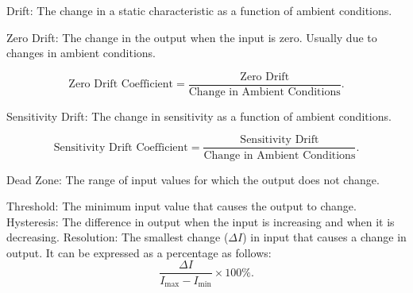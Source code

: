 \documentclass{report}
\begin{document}
\begin{itemize}
	\ii Drift: The change in a static characteristic as a function of ambient conditions.
	\begin{itemize}
		\ii Zero Drift: The change in the output when the input is zero. Usually due to changes in ambient conditions.

		\[
			\text{Zero Drift Coefficient} = \frac{\text{Zero Drift}}{\text{Change in Ambient Conditions}}
			.\]

		\ii Sensitivity Drift: The change in sensitivity as a function of ambient conditions.

		\[
			\text{Sensitivity Drift Coefficient} = \frac{\text{Sensitivity Drift}}{\text{Change in Ambient Conditions}}
			.\]

		\begin{figure}[H]
			\centering
		\end{figure}
	\end{itemize}

	\ii Dead Zone: The range of input values for which the output does not change.

	\begin{itemize}
		\ii Threshold: The minimum input value that causes the output to change.
		\ii Hysteresis: The difference in output when the input is increasing and when it is decreasing.
		\ii Resolution: The smallest change ($\Delta I$) in input that causes a change in output. It can be expressed as a percentage as follows:
		\[
			\frac{\Delta I}{I_{\text{max}} - I_{\text{min}}} \times 100\%
			.\]


\end{itemize}
\end{itemize}
\end{document}
